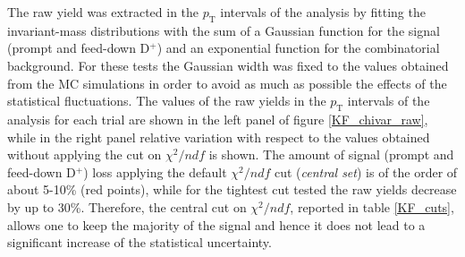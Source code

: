 \documentclass[b5paper,10pt,twoside,oldstyle,classica]{toptesi}
\newcommand{\pt}{p_\text{T}}
\begin{document}
The raw yield was extracted in the $\pt$ intervals of the analysis by fitting the invariant-mass distributions with the sum of a Gaussian function for the signal (prompt and feed-down D$^+$) and an exponential function for the combinatorial background. For these tests the Gaussian width was fixed to the values obtained from the MC simulations in order to avoid as much as possible the effects of the statistical fluctuations. The values of the raw yields in the $\pt$ intervals of the analysis for each trial are shown in the left panel of figure \ref{KF_chivar_raw}, while in the right panel relative variation with respect to the values obtained without applying the cut on $\chi^2/ndf$ is shown. The amount of signal (prompt and feed-down D$^+$) loss applying the default $\chi^2/ndf$ cut (\textit{central set}) is of the order of about 5-10\% (red points), while for the tightest cut tested the raw yields decrease by up to 30\%. Therefore, the central cut on $\chi^2/ndf$, reported in table \ref{KF_cuts}, allows one to keep the majority of the signal and hence it does not lead to a significant increase of the statistical uncertainty.   
\end{document}
